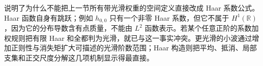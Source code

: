 说明了为什么不能把上一节所有带光滑权重的空间定义直接改成 Haar 系数公式。Haar 函数自身有跳跃；例如 \(h_{0,0}\) 只有一个非零 Haar 系数，但它不属于 \(H^1(\mathbb R)\)，因为它的分布导数含有点质量，不能由 \(L^2\) 函数表示。若某个任意正阶的系数加权规则把有限 Haar 和全都判为光滑，就已与这一事实冲突。更光滑的小波通过增加正则性与消失矩扩大可描述的光滑阶数范围；Haar 构造则把平均、抵消、局部支集和正交尺度分解这几项机制显示得最直接。
